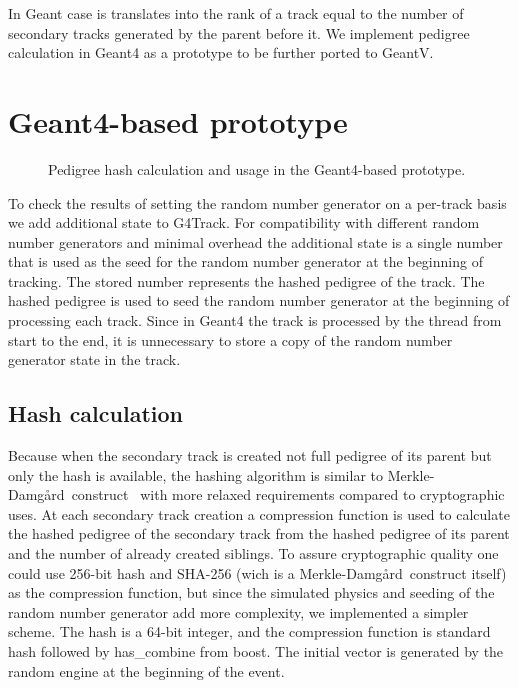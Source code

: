 \documentclass[a4paper, titlepage, 12pt]{article} %
\newcommand{\MD}{Merkle-Damg\r{a}rd}
\begin{document}
   In Geant case is translates into the rank of a track equal to the number of secondary tracks generated by the parent before it.
   We implement pedigree calculation in Geant4 as a prototype to be further ported to GeantV.
   
  
 \section{Geant4-based prototype}
  \begin{figure}
   \scalebox{.5}{}
   \caption{Pedigree hash calculation and usage in the Geant4-based prototype.}
  \end{figure}
  To check the results of setting the random number generator on a per-track basis we add additional state to G4Track.
  For compatibility with different random number generators and minimal overhead the additional state is a single number that is used as the seed for the random number generator at the beginning of tracking.
  The stored number represents the hashed pedigree of the track.
  The hashed pedigree is used to seed the random number generator at the beginning of processing each track.
  Since in Geant4 the track is processed by the thread from start to the end, it is unnecessary to store a copy of the random number generator state in the track.
 
  \subsection{Hash calculation}
   Because when the secondary track is created not full pedigree of its parent but only the hash is available, the hashing algorithm is similar to \MD\ construct~\cite{Damgard1990, Merkle1990} with more relaxed requirements compared to cryptographic uses.
   At each secondary track creation a compression function is used to calculate the hashed pedigree of the secondary track from the hashed pedigree of its parent and the number of already created siblings.
   To assure cryptographic quality one could use 256-bit hash and SHA-256 (wich is a \MD\ construct itself) as the compression function, but since the simulated physics and seeding of the random number generator add more complexity, we implemented a simpler scheme.
   The hash is a 64-bit integer, and the compression function is standard hash followed by has\_combine from boost.
   The initial vector is generated by the random engine at the beginning of the event.
 
\end{document}
